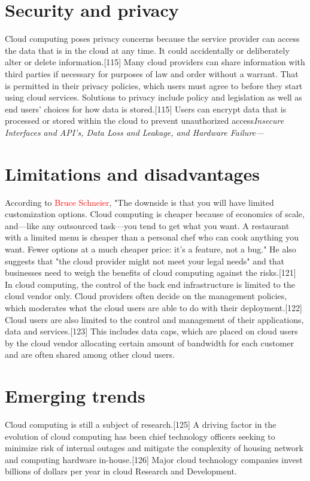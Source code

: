 \documentclass[11pt]{article}
\begin{document}
\section{\color{green}Security and privacy}
Cloud computing poses privacy concerns because the service provider can access the data that is in the cloud at any time. It could accidentally or deliberately alter or delete information.[115] Many cloud providers can share information with third parties if necessary for purposes of law and order without a warrant. That is permitted in their privacy policies, which users must agree to before they start using cloud services. Solutions to privacy include policy and legislation as well as end users' choices for how data is stored.[115] Users can encrypt data that is processed or stored within the cloud to prevent unauthorized access\textit{Insecure Interfaces and API's, Data Loss and Leakage, and Hardware Failure—}
\section{\color{green}Limitations and disadvantages}
According to \textcolor{red}{Bruce Schneier}, "The downside is that you will have limited customization options. Cloud computing is cheaper because of economics of scale, and—like any outsourced task—you tend to get what you want. A restaurant with a limited menu is cheaper than a personal chef who can cook anything you want. Fewer options at a much cheaper price: it's a feature, not a bug." He also suggests that "the cloud provider might not meet your legal needs" and that businesses need to weigh the benefits of cloud computing against the risks.[121] In cloud computing, the control of the back end infrastructure is limited to the cloud vendor only. Cloud providers often decide on the management policies, which moderates what the cloud users are able to do with their deployment.[122] Cloud users are also limited to the control and management of their applications, data and services.[123] This includes data caps, which are placed on cloud users by the cloud vendor allocating certain amount of bandwidth for each customer and are often shared among other cloud users.
\section{\color{green}Emerging trends}Cloud computing is still a subject of research.[125] A driving factor in the evolution of cloud computing has been chief technology officers seeking to minimize risk of internal outages and mitigate the complexity of housing network and computing hardware in-house.[126] Major cloud technology companies invest billions of dollars per year in cloud Research and Development.
\end{document}
